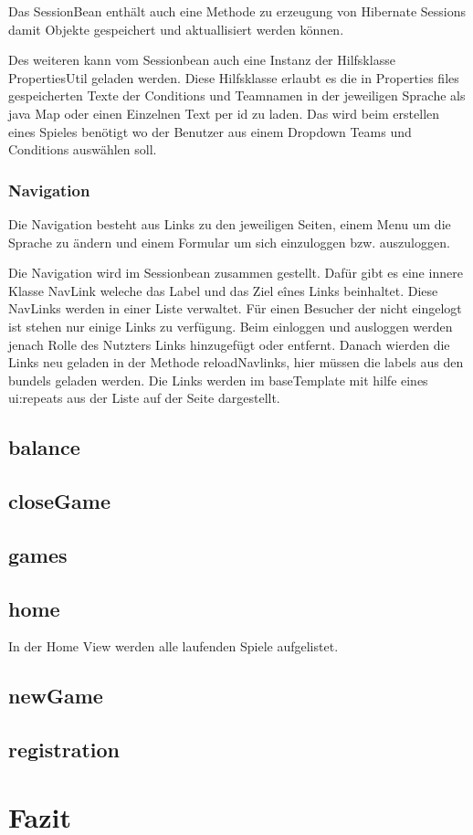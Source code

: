\documentclass[a4paper, abstracton]{scrartcl}
\begin{document}
  Das SessionBean enthält auch eine Methode zu erzeugung von Hibernate Sessions
  damit Objekte gespeichert und aktuallisiert werden können.
  
  Des weiteren kann vom Sessionbean auch eine Instanz der Hilfsklasse PropertiesUtil
  geladen werden. Diese Hilfsklasse erlaubt es die in Properties files gespeicherten
  Texte der Conditions und Teamnamen in der jeweiligen Sprache als java Map 
  oder einen Einzelnen Text per id zu laden.
  Das wird beim erstellen eines Spieles benötigt wo der Benutzer aus einem Dropdown
  Teams und Conditions auswählen soll.
  
\subsubsection{Navigation}
  Die Navigation besteht aus Links zu den jeweiligen Seiten, einem Menu um die
  Sprache zu ändern und einem Formular um sich einzuloggen bzw. auszuloggen.
  
  Die Navigation wird im Sessionbean zusammen gestellt. Dafür gibt es eine innere
  Klasse NavLink weleche das Label und das Ziel eînes Links beinhaltet.
  Diese NavLinks werden in einer Liste verwaltet. Für einen Besucher der nicht
  eingelogt ist stehen nur einige Links zu verfügung. Beim einloggen und ausloggen
  werden jenach Rolle des Nutzters Links hinzugefügt oder entfernt.
  Danach wierden die Links neu geladen in der Methode reloadNavlinks, hier müssen
  die labels aus den bundels geladen werden.
  Die Links werden im baseTemplate mit hilfe eines ui:repeats aus der Liste auf
  der Seite dargestellt.

\subsection{balance}
  

\subsection{closeGame}
  

\subsection{games}
  

\subsection{home}
  In der Home View werden alle laufenden Spiele aufgelistet.

\subsection{newGame}
  

\subsection{registration}

\section{Fazit}


\pagebreak
\listoffigures		%

\pagebreak	%


\pagebreak


\pagebreak	
\end{document}
